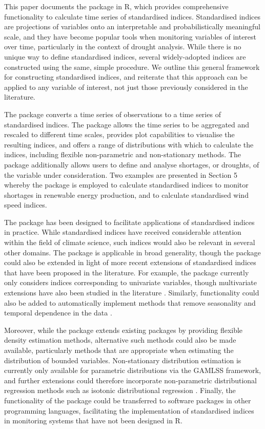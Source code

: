 This paper documents the  package in R, which provides comprehensive functionality to calculate time series of standardised indices. Standardised indices are projections of variables onto an interpretable and probabilistically meaningful scale, and they have become popular tools when monitoring variables of interest over time, particularly in the context of drought analysis. While there is no unique way to define standardised indices, several widely-adopted indices are constructed using the same, simple procedure. We outline this general framework for constructing standardised indices, and reiterate that this approach can be applied to any variable of interest, not just those previously considered in the literature.

The  package converts a time series of observations to a time series of standardised indices. The package allows the time series to be aggregated and rescaled to different time scales, provides plot capabilities to visualise the resulting indices, and offers a range of distributions with which to calculate the indices, including flexible non-parametric and non-stationary methods. The package additionally allows users to define and analyse shortages, or droughts, of the variable under consideration. Two examples are presented in Section 5 whereby the package is employed to calculate standardised indices to monitor shortages in renewable energy production, and to calculate standardised wind speed indices.

The package has been designed to facilitate applications of standardised indices in practice. While standardised indices have received considerable attention within the field of climate science, such indices would also be relevant in several other domains. The  package is applicable in broad generality, though the package could also be extended in light of more recent extensions of standardised indices that have been proposed in the literature. For example, the package currently only considers indices corresponding to univariate variables, though multivariate extensions have also been studied in the literature \citep[e.g.][]{ErhardtCzado2018,HaoEtAl2019}. Similarly, functionality could also be added to automatically implement methods that remove seasonality and temporal dependence in the data \citep{ErhardtCzado2018}.

Moreover, while the package extends existing packages by providing flexible density estimation methods, alternative such methods could also be made available, particularly methods that are appropriate when estimating the distribution of bounded variables. Non-stationary distribution estimation is currently only available for parametric distributions via the GAMLSS framework, and further extensions could therefore incorporate non-parametric distributional regression methods such as isotonic distributional regression \citep{HenziEtAl2021}. Finally, the functionality of the package could be transferred to software packages in other programming languages, facilitating the implementation of standardised indices in monitoring systems that have not been designed in R.

